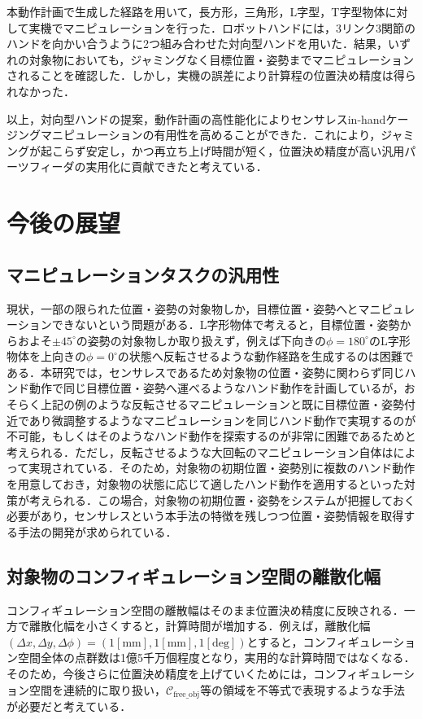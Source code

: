 \documentclass[a4paper,twoside,12pt,papersize, dvipdfmx]{iirthesis}
\begin{document}
本動作計画で生成した経路を用いて，長方形，三角形，L字型，T字型物体に対して実機でマニピュレーションを行った．ロボットハンドには，3リンク3関節のハンドを向かい合うように2つ組み合わせた対向型ハンドを用いた．結果，いずれの対象物においても，ジャミングなく目標位置・姿勢までマニピュレーションされることを確認した．しかし，実機の誤差により計算程の位置決め精度は得られなかった．

以上，対向型ハンドの提案，動作計画の高性能化によりセンサレスin-handケージングマニピュレーションの有用性を高めることができた．これにより，ジャミングが起こらず安定し，かつ再立ち上げ時間が短く，位置決め精度が高い汎用パーツフィーダの実用化に貢献できたと考えている．

\section{今後の展望}\label{sec::conclusion::future}
\subsection*{マニピュレーションタスクの汎用性}
現状，一部の限られた位置・姿勢の対象物しか，目標位置・姿勢へとマニピュレーションできないという問題がある．L字形物体で考えると，目標位置・姿勢からおよそ$\pm 45^\circ$の姿勢の対象物しか取り扱えず，例えば下向きの$\phi=180^\circ$のL字形物体を上向きの$\phi=0^\circ$の状態へ反転させるような動作経路を生成するのは困難である．本研究では，センサレスであるため対象物の位置・姿勢に関わらず同じハンド動作で同じ目標位置・姿勢へ運べるようなハンド動作を計画しているが，おそらく上記の例のような反転させるマニピュレーションと既に目標位置・姿勢付近であり微調整するようなマニピュレーションを同じハンド動作で実現するのが不可能，もしくはそのようなハンド動作を探索するのが非常に困難であるためと考えられる．ただし，反転させるような大回転のマニピュレーション自体は\cite{kamikukita2022}によって実現されている．そのため，対象物の初期位置・姿勢別に複数のハンド動作を用意しておき，対象物の状態に応じて適したハンド動作を適用するといった対策が考えられる．この場合，対象物の初期位置・姿勢をシステムが把握しておく必要があり，センサレスという本手法の特徴を残しつつ位置・姿勢情報を取得する手法の開発が求められている．

\subsection*{対象物のコンフィギュレーション空間の離散化幅}
コンフィギュレーション空間の離散幅はそのまま位置決め精度に反映される．一方で離散化幅を小さくすると，計算時間が増加する．例えば，離散化幅$(\Delta x, \Delta y, \Delta \phi)=(1 \mathrm{[mm]}, 1 \mathrm{[mm]}, 1 \mathrm{[deg]})$とすると，コンフィギュレーション空間全体の点群数は1億5千万個程度となり，実用的な計算時間ではなくなる．そのため，今後さらに位置決め精度を上げていくためには，コンフィギュレーション空間を連続的に取り扱い，$\mathcal{C}_{\mathrm{free\_obj}}$等の領域を不等式で表現するような手法が必要だと考えている．
\end{document}
